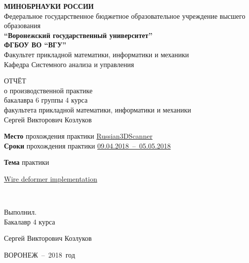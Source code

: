 \documentclass[a4paper]{article}
\providecommand{\StudentName}{Сергей Викторович Козлуков}
\providecommand{\StudentYear}{4}
\providecommand{\StudentGroup}{6}
\providecommand{\StudentDepartment}{Системного анализа и управления}
\providecommand{\ExternshipPlace}{Russian3DScanner}
\providecommand{\ExternshipDates}{09.04.2018~--~05.05.2018}
\providecommand{\ExternshipSubject}{Wire deformer implementation}
\begin{document}
\begin{center}
  \textbf{МИНОБРНАУКИ РОССИИ}\\
  Федеральное государственное бюджетное образовательное
  учреждение высшего образования\\
  \textbf{``Воронежский государственный университет''\\
    ФГБОУ ВО ``ВГУ''}\\[1cm]
  Факультет прикладной математики, информатики и механики\\
  Кафедра {\StudentDepartment}

  \vfill

  ОТЧЁТ\\
  о производственной практике\\
  бакалавра {\StudentGroup} группы {\StudentYear} курса\\
  факультета прикладной математики, информатики и механики\\
  \StudentName

  \vfill

  {
    \textbf{Место} прохождения практики \hfill \uline{\ExternshipPlace}
  }\\
  {
    \textbf{Сроки} прохождения практики \hfill \uline{\ExternshipDates}
  }\\
  {
    \textbf{Тема} практики \hfill
    \parbox{.33\textwidth}{
      \uline{\ExternshipSubject}
    }
  }\\

  \vfill

  {
    \parbox{.33\textwidth}{
      Выполнил. \\
      Бакалавр {\StudentYear} курса
    }
    \hfill
    \StudentName
  }

  \vfill

  ВОРОНЕЖ~--~2018~год
  
\end{center}
\end{document}
